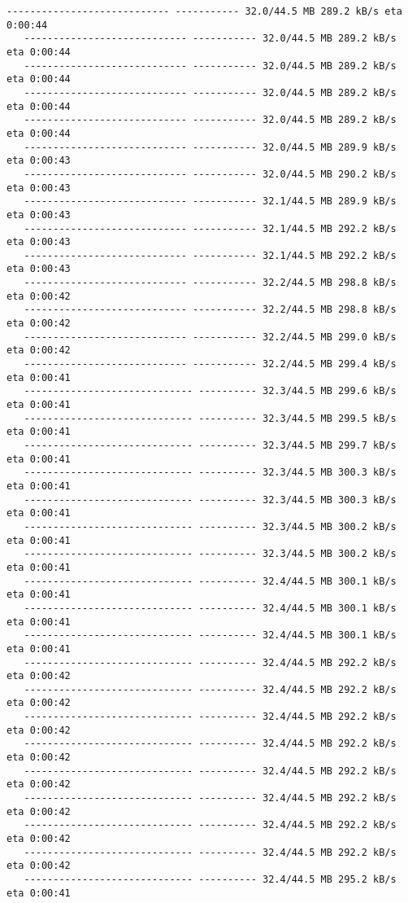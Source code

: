 \documentclass[11pt]{article}
\begin{document}
\begin{Verbatim}[commandchars=\\\{\}]
   ---------------------------- ----------- 32.0/44.5 MB 289.2 kB/s eta 0:00:44
   ---------------------------- ----------- 32.0/44.5 MB 289.2 kB/s eta 0:00:44
   ---------------------------- ----------- 32.0/44.5 MB 289.2 kB/s eta 0:00:44
   ---------------------------- ----------- 32.0/44.5 MB 289.2 kB/s eta 0:00:44
   ---------------------------- ----------- 32.0/44.5 MB 289.2 kB/s eta 0:00:44
   ---------------------------- ----------- 32.0/44.5 MB 289.9 kB/s eta 0:00:43
   ---------------------------- ----------- 32.0/44.5 MB 290.2 kB/s eta 0:00:43
   ---------------------------- ----------- 32.1/44.5 MB 289.9 kB/s eta 0:00:43
   ---------------------------- ----------- 32.1/44.5 MB 292.2 kB/s eta 0:00:43
   ---------------------------- ----------- 32.1/44.5 MB 292.2 kB/s eta 0:00:43
   ---------------------------- ----------- 32.2/44.5 MB 298.8 kB/s eta 0:00:42
   ---------------------------- ----------- 32.2/44.5 MB 298.8 kB/s eta 0:00:42
   ---------------------------- ----------- 32.2/44.5 MB 299.0 kB/s eta 0:00:42
   ---------------------------- ----------- 32.2/44.5 MB 299.4 kB/s eta 0:00:41
   ----------------------------- ---------- 32.3/44.5 MB 299.6 kB/s eta 0:00:41
   ----------------------------- ---------- 32.3/44.5 MB 299.5 kB/s eta 0:00:41
   ----------------------------- ---------- 32.3/44.5 MB 299.7 kB/s eta 0:00:41
   ----------------------------- ---------- 32.3/44.5 MB 300.3 kB/s eta 0:00:41
   ----------------------------- ---------- 32.3/44.5 MB 300.3 kB/s eta 0:00:41
   ----------------------------- ---------- 32.3/44.5 MB 300.2 kB/s eta 0:00:41
   ----------------------------- ---------- 32.3/44.5 MB 300.2 kB/s eta 0:00:41
   ----------------------------- ---------- 32.4/44.5 MB 300.1 kB/s eta 0:00:41
   ----------------------------- ---------- 32.4/44.5 MB 300.1 kB/s eta 0:00:41
   ----------------------------- ---------- 32.4/44.5 MB 300.1 kB/s eta 0:00:41
   ----------------------------- ---------- 32.4/44.5 MB 292.2 kB/s eta 0:00:42
   ----------------------------- ---------- 32.4/44.5 MB 292.2 kB/s eta 0:00:42
   ----------------------------- ---------- 32.4/44.5 MB 292.2 kB/s eta 0:00:42
   ----------------------------- ---------- 32.4/44.5 MB 292.2 kB/s eta 0:00:42
   ----------------------------- ---------- 32.4/44.5 MB 292.2 kB/s eta 0:00:42
   ----------------------------- ---------- 32.4/44.5 MB 292.2 kB/s eta 0:00:42
   ----------------------------- ---------- 32.4/44.5 MB 292.2 kB/s eta 0:00:42
   ----------------------------- ---------- 32.4/44.5 MB 292.2 kB/s eta 0:00:42
   ----------------------------- ---------- 32.4/44.5 MB 295.2 kB/s eta 0:00:41

\end{Verbatim}
\end{document}
